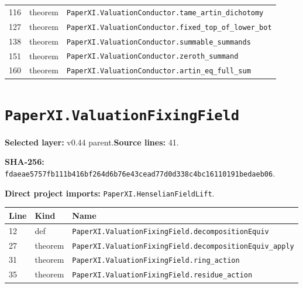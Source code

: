 \documentclass[10pt,oneside]{book}
\begin{document}
\begin{longtable}{@{}p{}p{}p{}@{}}
116&theorem&\nolinkurl{PaperXI.ValuationConductor.tame_artin_dichotomy}\\

127&theorem&\nolinkurl{PaperXI.ValuationConductor.fixed_top_of_lower_bot}\\

138&theorem&\nolinkurl{PaperXI.ValuationConductor.summable_summands}\\

151&theorem&\nolinkurl{PaperXI.ValuationConductor.zeroth_summand}\\

160&theorem&\nolinkurl{PaperXI.ValuationConductor.artin_eq_full_sum}\\

\bottomrule\end{longtable}

\section{\texorpdfstring{\nolinkurl{PaperXI.ValuationFixingField}}{PaperXI.ValuationFixingField}}\label{module:PaperXI.ValuationFixingField}

\textbf{Selected layer:} v0.44 parent.\quad\textbf{Source lines:} 41.\par\textbf{SHA-256:} {\scriptsize\nolinkurl{fdaeae5757fb111b416bf264d6b76e43cead77d0d338c4bc16110191bedaeb06}}.


\textbf{Direct project imports:} \nolinkurl{PaperXI.HenselianFieldLift}.

\begin{longtable}{@{}p{}p{}p{}@{}}\toprule Line&Kind&Name\\\midrule\endhead

12&def&\nolinkurl{PaperXI.ValuationFixingField.decompositionEquiv}\\

27&theorem&\nolinkurl{PaperXI.ValuationFixingField.decompositionEquiv_apply}\\

31&theorem&\nolinkurl{PaperXI.ValuationFixingField.ring_action}\\

35&theorem&\nolinkurl{PaperXI.ValuationFixingField.residue_action}\\

\bottomrule\end{longtable}
\end{document}
